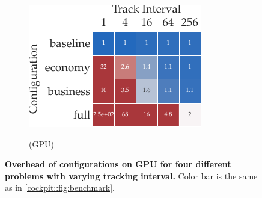\begin{figure}[t]
\begin{subfigure}[t]{0.35\linewidth}
    \label{cockpit::fig:app_benchmark_configurations_cuda-cifar}
  \end{subfigure}
  \hspace{0.1\linewidth}
  \begin{subfigure}[t]{0.35\linewidth}
    \centering
    \caption{\fmnist \twoctwod (GPU)}
    \includegraphics{../repos/cockpit-paper/fig/01_benchmark/output/fig_grid/benchmark_fmnist_2c2d_cuda_app_thesis-wide}
    \label{cockpit::fig:app_benchmark_configurations_cuda-fmnist}
  \end{subfigure}
  \caption{\textbf{Overhead of \cockpittitle configurations on GPU for four
      different problems with varying tracking interval.} Color bar is the same
    as in \autoref{cockpit::fig:benchmark}.}
  \label{cockpit::fig:app_benchmark_configurations_cuda}
\end{figure}

\captionsetup[subfigure]{justification=centering, singlelinecheck=true}

